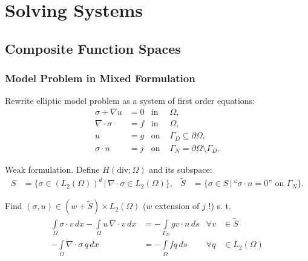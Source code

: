 \section{Solving Systems}

\subsection{Composite Function Spaces}

\begin{frame}
\frametitle{Model Problem in Mixed Formulation}
Rewrite elliptic model problem as a system of first order equations:
\begin{subequations}
\label{Eq:DiffusionEquationMixedForm}
\begin{align*}
\sigma + \nabla u &= 0 & \text{in }& \Omega,\\
\nabla \cdot \sigma     &= f & \text{in }& \Omega,\\
                      u &= g& \text{on }& \Gamma_D\subseteq\partial\Omega,\\
        \sigma\cdot n  &= j& \text{on }& \Gamma_N=\partial\Omega\setminus\Gamma_D.
\end{align*}
\end{subequations}

Weak formulation. Define $H(\text{div};\Omega)$ and its subspace:
\begin{subequations}
\begin{align*}
S &= \{\sigma\in \left(L_2(\Omega)\right)^d \,|\,
\nabla\cdot \sigma \in L_2(\Omega)\}, &
\tilde{S} &= \{\sigma\in S \,|\, \text{``$\sigma\cdot n=0$'' on $\Gamma_N$} \}.
\end{align*}
\end{subequations}

Find $(\sigma,u)\in (w+\tilde{S})\times L_2(\Omega)$ ($w$ extension of $j$ !) s. t.
\begin{align*}
\int\limits_\Omega \sigma\cdot v \, dx  -\int\limits_\Omega
u \, \nabla\cdot v \, dx & =
-\int\limits_{\Gamma_D} g v\cdot n \, ds
& \forall v &\in \tilde{S}\\
- \int\limits_\Omega \nabla\cdot\sigma \, q \, dx      &=
- \int\limits_\Omega f q \, ds &
\forall q &\in L_2(\Omega)
\end{align*}
\end{frame}


